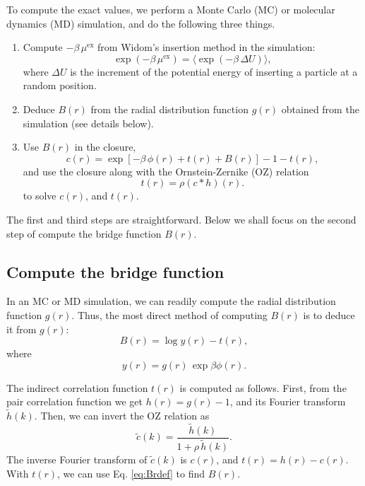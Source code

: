 \documentclass[preprint]{revtex4-1}
\newcommand{\supex}[1]{ { { #1 }^{ \mathrm{ex} } } }
\newcommand{\muex}{\supex{\mu}}
\begin{document}
To compute the exact values, we perform
a Monte Carlo (MC) or molecular dynamics (MD) simulation,
and do the following three things.
%
\begin{enumerate}
%
%
%
\item
Compute $-\beta \, \muex$
from Widom's insertion method in the simulation:
\begin{equation}
  \exp( - \beta \, \muex)  = \langle \exp(-\beta \, \Delta U) \rangle,
  \label{eq:widom}
\end{equation}
where $\Delta U$ is the increment of the potential energy
of inserting a particle at a random position.
%
%
%
\item
Deduce $B(r)$ from the radial distribution function $g(r)$
obtained from the simulation
(see details below).
%
%
%
\item
Use $B(r)$ in the closure,
\[
  c(r) = \exp[-\beta \, \phi(r) + t(r) + B(r)] - 1 - t(r),
\]
and use the closure along with the Ornstein-Zernike (OZ) relation
\begin{equation}
  t(r) = \rho (c * h) (r).
  \label{eq:oz}
\end{equation}
to solve $c(r)$, and $t(r)$.
\end{enumerate}

The first and third steps are straightforward.
Below we shall focus on the second step
  of compute the bridge function $B(r)$.




\subsection{Compute the bridge function}

In an MC or MD simulation, we can readily compute
  the radial distribution function $g(r)$.
%
Thus, the most direct method of computing $B(r)$
is to deduce it from $g(r)$:
\begin{equation}
  B(r) = \log y(r) - t(r),
  \label{eq:Brdef}
\end{equation}
where
\[
  y(r) = g(r) \, \exp \beta \phi(r).
\]

The indirect correlation function $t(r)$ is computed as follows.
%
First, from the pair correlation function we get $h(r) = g(r) - 1$,
and its Fourier transform $\tilde h(k)$.
%
Then, we can invert the OZ relation as
\[
  \tilde c(k)
= \frac{ \tilde h(k) }
  { 1 + \rho \, \tilde h(k) }.
\]
The inverse Fourier transform of $\tilde c(k)$ is $c(r)$,
and $t(r) = h(r) - c(r)$.
%
With $t(r)$, we can use Eq. \eqref{eq:Brdef} to find $B(r)$.
\end{document}
